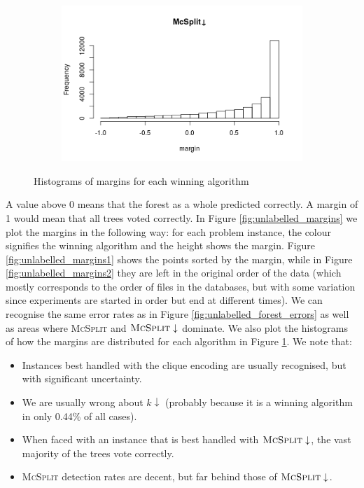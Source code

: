 \documentclass{l4proj}
\theoremstyle{definition}
\theoremstyle{remark}
\begin{document}
\begin{figure}
\begin{subfigure}[t]{0.49\textwidth}
  \end{subfigure}
  \begin{subfigure}[t]{0.49\textwidth}
    \centering
    \includegraphics[width=\textwidth]{images/mcsplitdown_hist.png}
  \end{subfigure}
  \caption{Histograms of margins for each winning algorithm}
  \label{fig:unlabelled_margin_hist}
\end{figure}

A value above 0 means that the forest as a whole predicted correctly. A margin
of 1 would mean that all trees voted correctly. In Figure
\ref{fig:unlabelled_margins} we plot the margins in the following way: for each
problem instance, the colour signifies the winning algorithm and the height
shows the margin. Figure \ref{fig:unlabelled_margins1} shows the points sorted
by the margin, while in Figure \ref{fig:unlabelled_margins2} they are left in
the original order of the data (which mostly corresponds to the order of files
in the databases, but with some variation since experiments are started in order
but end at different times). We can recognise the same error rates as in Figure
\ref{fig:unlabelled_forest_errors} as well as areas where \textsc{McSplit} and
$\textsc{McSplit}\downarrow$ dominate. We also plot the histograms of how the
margins are distributed for each algorithm in Figure
\ref{fig:unlabelled_margin_hist}. We note that:

\begin{itemize}
\item Instances best handled with the clique encoding are usually recognised, but
  with significant uncertainty.
\item We are usually wrong about $k\downarrow$ (probably because it is a
  winning algorithm in only 0.44\% of all cases).
\item When faced with an instance that is best handled with
  $\textsc{McSplit}\downarrow$, the vast majority of the trees vote correctly.
\item \textsc{McSplit} detection rates are decent, but far behind those of
  $\textsc{McSplit}\downarrow$.
\end{itemize}
\end{document}
